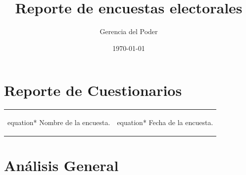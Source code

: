 \documentclass[10,a4paperpaper,]{article}
\title{Reporte de encuestas electorales}
\author{Gerencia del Poder}
\date{\today}
\begin{document}
\renewcommand{\contentsname}{Gerencia del Poder}

\renewcommand{\pagename}{Página}


\maketitle
\tableofcontents
{}
\clearpage

\section*{Reporte de Cuestionarios}

\begin{center}
  \begin{tabular}{ c  c }
    \begin{mybox}[colback=white, width = 7cm]{equation*}
      Nombre de la encuesta.
    \end{mybox}
    & 
    \begin{mybox}[colback=white, width = 7cm]{equation*}
      Fecha de la encuesta.
    \end{mybox}
  \end{tabular}
\end{center}

\section{Análisis General}
\end{document}
